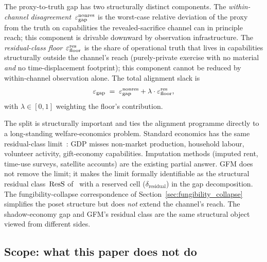 The proxy-to-truth gap has two structurally distinct components.
The \emph{within-channel disagreement}~$\varepsilon_{\mathrm{gap}}^{\mathrm{nonres}}$ is the
worst-case relative deviation of the proxy from the truth on
capabilities the revealed-sacrifice channel can in principle
reach; this component is drivable downward by observation
infrastructure.  The \emph{residual-class floor}~$\varepsilon_{\mathrm{floor}}^{\mathrm{res}}$ is
the share of operational truth that lives in capabilities
structurally outside the channel's reach (purely-private exercise
with no material \emph{and} no time-displacement footprint); this
component cannot be reduced by within-channel observation alone.
The total alignment slack is
\[
  \varepsilon_{\mathrm{gap}} \;=\; \varepsilon_{\mathrm{gap}}^{\mathrm{nonres}} + \lambda \cdot \varepsilon_{\mathrm{floor}}^{\mathrm{res}},
\]
with $\lambda \in [0,1]$ weighting the floor's contribution.

The split is structurally important and ties the alignment
programme directly to a long-standing welfare-economics problem.
Standard economics has the same residual-class
limit~\citep{stiglitz2009report}: GDP misses non-market production,
household labour, volunteer activity, gift-economy capabilities.
Imputation methods (imputed rent, time-use surveys, satellite
accounts) are the existing partial answer.  GFM does not remove
the limit; it makes the limit formally identifiable as the
structural residual class~$\mathrm{ResS}$
of~\citep[Definition~12]{lasser2026paper8b} with a reserved cell
($\delta_{\mathrm{residual}}$) in the gap decomposition.  The
fungibility-collapse correspondence of
Section~\ref{sec:fungibility_collapse} simplifies the poset
structure but does \emph{not} extend the channel's reach.  The
shadow-economy gap and GFM's residual class are the same
structural object viewed from different sides.

\subsection{Scope: what this paper does not do}
\label{sec:not_do}

